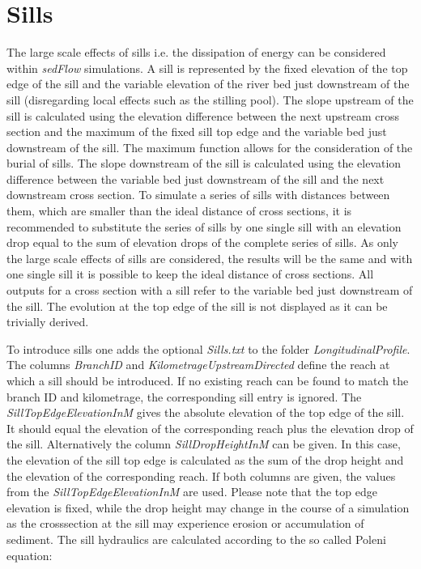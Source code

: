 \documentclass[11pt,a4paper]{article}
\begin{document}
\section{Sills}\label{Sills}
The large scale effects of sills i.e. the dissipation of energy can be considered within \emph{sedFlow} simulations. A sill is represented by the fixed elevation of the top edge of the sill and the variable elevation of the river bed just downstream of the sill (disregarding local effects such as the stilling pool). The slope upstream of the sill is calculated using the elevation difference between the next upstream cross section and the maximum of the fixed sill top edge and the variable bed just downstream of the sill. The maximum function allows for the consideration of the burial of sills. The slope downstream of the sill is calculated using the elevation difference between the variable bed just downstream of the sill and the next downstream cross section. To simulate a series of sills with distances between them, which are smaller than the ideal distance of cross sections, it is recommended to substitute the series of sills by one single sill with an elevation drop equal to the sum of elevation drops of the complete series of sills. As only the large scale effects of sills are considered, the results will be the same and with one single sill it is possible to keep the ideal distance of cross sections. All outputs for a cross section with a sill refer to the variable bed just downstream of the sill. The evolution at the top edge of the sill is not displayed as it can be trivially derived.

To introduce sills one adds the optional \emph{Sills.txt} to the folder \emph{LongitudinalProfile}. The columns \emph{BranchID} and \emph{KilometrageUpstreamDirected} define the reach at which a sill should be introduced. If no existing reach can be found to match the branch ID and kilometrage, the corresponding sill entry is ignored. The \emph{SillTopEdgeElevationInM} gives the absolute elevation of the top edge of the sill. It should equal the elevation of the corresponding reach plus the elevation drop of the sill. Alternatively the column \emph{SillDropHeightInM} can be given. In this case, the elevation of the sill top edge is calculated as the sum of the drop height and the elevation of the corresponding reach. If both columns are given, the values from the \emph{SillTopEdgeElevationInM} are used. Please note that the top edge elevation is fixed, while the drop height may change in the course of a simulation as the crosssection at the sill may experience erosion or accumulation of sediment. The sill hydraulics are calculated according to the so called Poleni equation:
\end{document}
